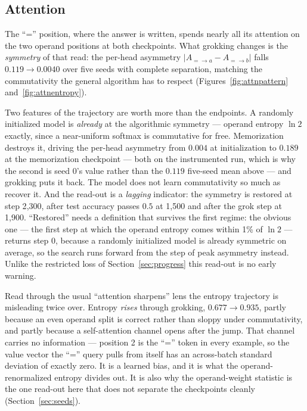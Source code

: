 \documentclass[11pt]{article}
\begin{document}
\subsection{Attention}
\label{sec:attention}

The ``='' position, where the answer is written, spends nearly all its
attention on the two operand positions at both checkpoints. What grokking
changes is the \emph{symmetry} of that read: the per-head asymmetry
$\lvert A_{=\to a} - A_{=\to b}\rvert$ falls $0.119 \to 0.0040$ over five
seeds with complete separation, matching the commutativity the general
algorithm has to respect (Figures~\ref{fig:attnpattern}
and~\ref{fig:attnentropy}).

Two features of the trajectory are worth more than the endpoints. A randomly
initialized model is \emph{already} at the algorithmic symmetry --- operand
entropy $\ln 2$ exactly, since a near-uniform softmax is commutative for free.
Memorization destroys it, driving the per-head asymmetry from $0.004$ at
initialization to $0.189$ at the memorization checkpoint --- both on the
instrumented run, which is why the second is seed 0's value rather than the
$0.119$ five-seed mean above --- and grokking puts it back. The model does not learn commutativity so
much as recover it. And the read-out is a \emph{lagging} indicator: the
symmetry is restored at step 2{,}300, after test accuracy passes $0.5$ at
1{,}500 and after the grok step at 1{,}900. ``Restored'' needs a definition
that survives the first regime: the obvious one --- the first step at which the
operand entropy comes within 1\% of $\ln 2$ --- returns step 0, because a
randomly initialized model is already symmetric on average, so the search runs
forward from the step of peak asymmetry instead. Unlike the restricted loss of
Section~\ref{sec:progress} this read-out is no early warning.

Read through the usual ``attention sharpens'' lens the entropy trajectory is
misleading twice over. Entropy \emph{rises} through grokking, $0.677 \to
0.935$, partly because an even operand split is correct rather than sloppy
under commutativity, and partly because a self-attention channel opens after
the jump. That channel carries no information --- position 2 is the ``='' token
in every example, so the value vector the ``='' query pulls from itself has an
across-batch standard deviation of exactly zero. It is a learned bias, and it
is what the operand-renormalized entropy divides out. It is also why the
operand-weight statistic is the one read-out here that does not separate the
checkpoints cleanly (Section~\ref{sec:seeds}).
\end{document}
